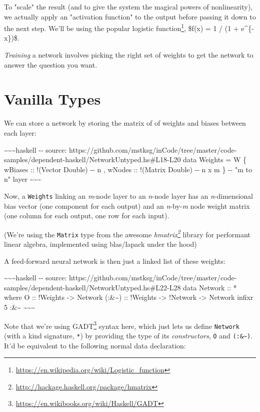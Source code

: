 \documentclass[]{article}
\renewcommand{\href}[2]{#2\footnote{\url{#1}}}
\begin{document}
To "scale" the result (and to give the system the magical powers of
nonlinearity), we actually apply an "activation function" to the output before
passing it down to the next step. We'll be using the popular
\href{https://en.wikipedia.org/wiki/Logistic_function}{logistic function},
\$f(x) = 1 / (1 + e\^{}\{-x\})\$.

\emph{Training} a network involves picking the right set of weights to get the
network to answer the question you want.

\section{Vanilla Types}

We can store a network by storing the matrix of of weights and biases between
each layer:

\textasciitilde{}\textasciitilde{}\textasciitilde{}haskell -\/- source:
https://github.com/mstksg/inCode/tree/master/code-samples/dependent-haskell/NetworkUntyped.hs\#L18-L20
data Weights = W \{ wBiases :: !(Vector Double) -\/- n , wNodes :: !(Matrix
Double) -\/- n x m \} -\/- "m to n" layer
\textasciitilde{}\textasciitilde{}\textasciitilde{}

Now, a \texttt{Weights} linking an \emph{m}-node layer to an \emph{n}-node layer
has an \emph{n}-dimensional bias vector (one component for each output) and an
\emph{n}-by-\emph{m} node weight matrix (one column for each output, one row for
each input).

(We're using the \texttt{Matrix} type from the awesome
\emph{\href{http://hackage.haskell.org/package/hmatrix}{hmatrix}} library for
performant linear algebra, implemented using blas/lapack under the hood)

A feed-forward neural network is then just a linked list of these weights:

\textasciitilde{}\textasciitilde{}\textasciitilde{}haskell -\/- source:
https://github.com/mstksg/inCode/tree/master/code-samples/dependent-haskell/NetworkUntyped.hs\#L22-L28
data Network :: * where O :: !Weights -\textgreater{} Network
(:\&\textasciitilde{}) :: !Weights -\textgreater{} !Network -\textgreater{}
Network infixr 5 :\&\textasciitilde{}
\textasciitilde{}\textasciitilde{}\textasciitilde{}

Note that we're using \href{https://en.wikibooks.org/wiki/Haskell/GADT}{GADT}
syntax here, which just lets us define \texttt{Network} (with a kind signature,
\texttt{*}) by providing the type of its \emph{constructors}, \texttt{O} and
\texttt{(:\&\textasciitilde{})}. It'd be equivalent to the following normal data
declaration:
\end{document}
